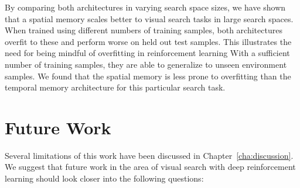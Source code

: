 By comparing both architectures in varying search space sizes, we have shown that a spatial memory scales better to visual search tasks in large search spaces.
When trained using different numbers of training samples, both architectures overfit to these and perform worse on held out test samples.
This illustrates the need for being mindful of overfitting in reinforcement learning
With a sufficient number of training samples, they are able to generalize to unseen environment samples.
We found that the spatial memory is less prone to overfitting than the temporal memory architecture for this particular search task.

\section{Future Work}

Several limitations of this work have been discussed in Chapter~\ref{cha:discussion}.
We suggest that future work in the area of visual search with deep reinforcement learning should look closer into the following questions:

